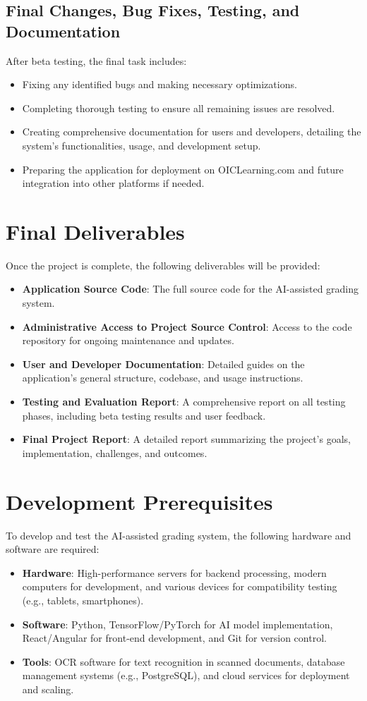 \documentclass[ms,twoside,print]{nuthesis}
\begin{document}
\subsection{Final Changes, Bug Fixes, Testing, and Documentation}
After beta testing, the final task includes:
\begin{itemize}
    \item Fixing any identified bugs and making necessary optimizations.
    \item Completing thorough testing to ensure all remaining issues are resolved.
    \item Creating comprehensive documentation for users and developers, detailing the system's functionalities, usage, and development setup.
    \item Preparing the application for deployment on OICLearning.com and future integration into other platforms if needed.
\end{itemize}

\section{Final Deliverables}
Once the project is complete, the following deliverables will be provided:
\begin{itemize}
    \item \textbf{Application Source Code}: The full source code for the AI-assisted grading system.
    \item \textbf{Administrative Access to Project Source Control}: Access to the code repository for ongoing maintenance and updates.
    \item \textbf{User and Developer Documentation}: Detailed guides on the application's general structure, codebase, and usage instructions.
    \item \textbf{Testing and Evaluation Report}: A comprehensive report on all testing phases, including beta testing results and user feedback.
    \item \textbf{Final Project Report}: A detailed report summarizing the project's goals, implementation, challenges, and outcomes.
\end{itemize}

\section{Development Prerequisites}
To develop and test the AI-assisted grading system, the following hardware and software are required:
\begin{itemize}
    \item \textbf{Hardware}: High-performance servers for backend processing, modern computers for development, and various devices for compatibility testing (e.g., tablets, smartphones).
    \item \textbf{Software}: Python, TensorFlow/PyTorch for AI model implementation, React/Angular for front-end development, and Git for version control.
    \item \textbf{Tools}: OCR software for text recognition in scanned documents, database management systems (e.g., PostgreSQL), and cloud services for deployment and scaling.
\end{itemize}
\end{document}
